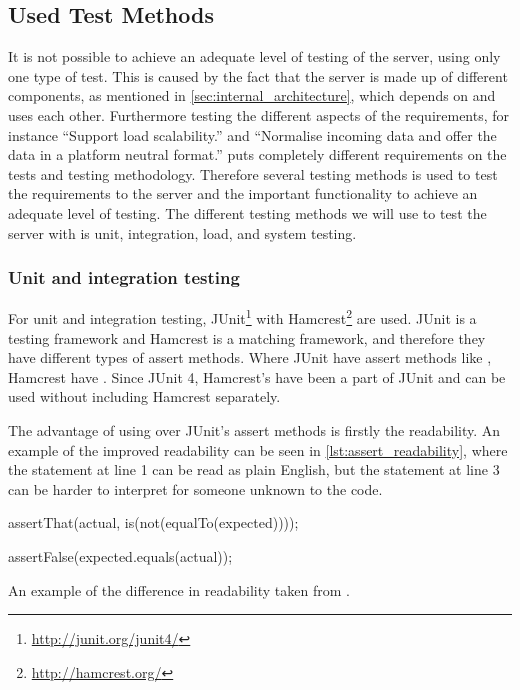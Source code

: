 \subsection{Used Test Methods}
It is not possible to achieve an adequate level of testing of the server, using only one type of test.
This is caused by the fact that the server is made up of different components, 
as mentioned in \cref{sec:internal_architecture}, 
which depends on and uses each other.
Furthermore testing the different aspects of the requirements, for instance ``Support load scalability.'' 
and ``Normalise incoming data and offer the data in a platform neutral format.'' puts completely different
requirements on the tests and testing methodology.
Therefore several testing methods is used to test the requirements to the server 
and the important functionality to achieve an adequate level of testing.
The different testing methods we will use to test the server with is unit, integration, load, and system testing.

\subsubsection{Unit and integration testing}
For unit and integration testing, JUnit\footnote{\url{http://junit.org/junit4/}} with Hamcrest\footnote{\url{http://hamcrest.org/}} are used.
JUnit is a testing framework and Hamcrest is a matching framework, and therefore they have different types of assert methods.
Where JUnit have assert methods like , Hamcrest have .
Since JUnit 4, Hamcrest's  have been a part of JUnit and can be used without including Hamcrest separately\cite{hamcrest_vs_junit}.

The advantage of using  over JUnit's assert methods is firstly the readability.
An example of the improved readability can be seen in \cref{lst:assert_readability}, 
where the  statement at line 1 can be read as plain English, 
but the  statement at line 3 can be harder to interpret for someone unknown to the code\cite{hamcrest_vs_junit}.

\begin{listing}
    \begin{java2}
        assertThat(actual, is(not(equalTo(expected))));

        assertFalse(expected.equals(actual));
    \end{java2}
    \caption{An example of the difference in readability taken from \cite{hamcrest_vs_junit}.}
    \label{lst:assert_readability}
\end{listing}

